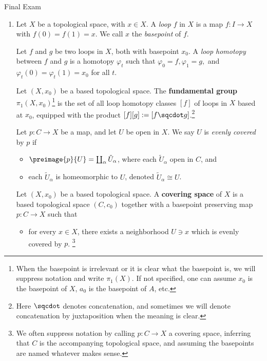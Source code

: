 \documentclass[12pt,letterpaper]{article}
\renewcommand{\phi}{\varphi}
\begin{document}
\pagestyle{fancy}
\begin{center}
{\Large Final Exam}%
\end{center}

\begin{enumerate}

\item \mbox{}\vspace*{-24pt}
\begin{definition*}
Let $X$ be a topological space, with $x\in X$. A \emph{loop} $f$ in $X$ is a map $f:I\to X$ with $f(0)=f(1)=x$. We call $x$ the \emph{basepoint} of $f$. 
\end{definition*}

\begin{definition*}
Let $f$ and $g$ be two loops in $X$, both with basepoint $x_0$. A \emph{loop homotopy} between $f$ and $g$ is a homotopy $\phi_t$ such that $\phi_0=f, \phi_1=g,$ and $\phi_t(0)=\phi_t(1)=x_0$ for all $t$. 
\end{definition*}

\begin{definition*}
Let $(X,x_0)$ be a based topological space. The \textbf{fundamental group} $\pi_1(X,x_0)$\footnote{When the basepoint is irrelevant or it is clear what the basepoint is, we will suppress notation and write $\pi_1(X)$. If not specified, one can assume $x_0$ is the basepoint of $X$, $a_0$ is the basepoint of $A$, etc.} is the set of all loop homotopy classes $[f]$ of loops in $X$ based at $x_0$, equipped with the product $[f][g]:=[f\sqcdot g]$.\footnote{Here $\sqcdot$ denotes concatenation, and sometimes we will denote concatenation by juxtaposition when the meaning is clear.}
\end{definition*}

\begin{definition*}
Let $p:C\to X$ be a map, and let $U$ be open in $X$. We say $U$ is \emph{evenly covered} by $p$ if 
	\begin{itemize}
	\item $\preimage{p}{U}=\coprod_\alpha \tilde{U}_\alpha$, where each $\tilde{U}_\alpha$ open in $C$, and 
	\item each $\tilde{U}_\alpha$ is homeomorphic to $U$, denoted $\tilde{U}_\alpha \cong U$. 
	\end{itemize}
\end{definition*}

\begin{definition*}
Let $(X,x_0)$ be a based topological space. A \textbf{covering space} of $X$ is a based topological space $(C,c_0)$ together with a basepoint preserving map $p:C\to X$ such that 
\begin{itemize}
\item for every $x\in X$, there exists a neighborhood $U\ni x$ which is evenly covered by $p$. \footnote{We often suppress notation by calling $p:C\to X$ a covering space, inferring that $C$ is the accompanying topological space, and assuming the basepoints are named whatever makes sense.}
\end{itemize} 
\end{definition*}


\end{enumerate}
\end{document}

